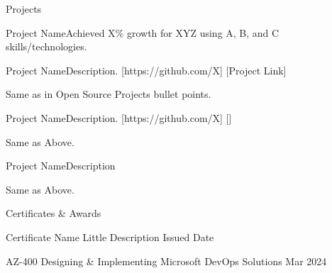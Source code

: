 \documentclass{resume} %
\begin{document}
\begin{rSection}{Projects}
    \begin{rProjects}{Project Name}{Achieved X\% growth for XYZ using A, B, and C skills/technologies.}
    \end{rProjects}

    \begin{rProjects}{Project Name}{Description.}
        [https://github.com/X]
        [Project Link] %
        \begin{rItemize}
            \item Same as in Open Source Projects bullet points.
        \end{rItemize}
    \end{rProjects}

    \begin{rProjects}{Project Name}{Description.}
        [https://github.com/X]
        []
        \begin{rItemize}
            \item Same as Above.
        \end{rItemize}
    \end{rProjects}

    \begin{rProjects}{Project Name}{Description}
        \begin{rItemize}
            \item Same as Above.
        \end{rItemize}
    \end{rProjects}
\end{rSection}


\begin{rSection}{Certificates \& Awards}
    \begin{rOSubsection}
        {Certificate Name}
        {Little Description}
        {Issued Date}
    \end{rOSubsection}

    \begin{rOSubsection}
        {AZ-400}
        {Designing \& Implementing Microsoft DevOps Solutions}
        {Mar 2024}
    \end{rOSubsection}
\end{rSection}
\end{document}
